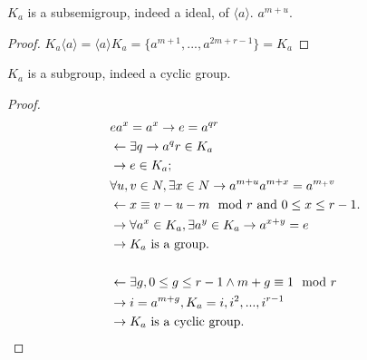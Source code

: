 \begin{Prop}
    $K_a$ is a subsemigroup, indeed a ideal, of $\langle a\rangle$. $a^{m+u}$.
    \begin{proof}
        $K_a\langle a\rangle=\langle a\rangle K_a=\{a^{m+1},...,a^{2m+r-1}\}=K_a$
    \end{proof}
    $K_a$ is a subgroup, indeed a cyclic group.
    \begin{proof}
        \begin{align*}
            &ea^x=a^x \rightarrow e=a^{qr}  \\
            &\leftarrow \exists q \rightarrow a^qr \in K_a \\
            &\rightarrow e \in K_a;  \\
            &\forall u,v \in N, \exists x \in N \rightarrow a^{m+u}a^{m+x}=a^{m_+v} \\
            &\leftarrow x\equiv v-u-m\mod{r} \text{\space and } 0\leq x\leq r-1. \\
            &\rightarrow \forall a^x \in K_a, \exists a^y \in K_a \rightarrow a^{x+y}=e \\
            &\rightarrow K_a \text{ is a group}.    \\
            &\\
            &\leftarrow \exists g,0\leq g\leq r-1 \wedge m+g\equiv 1\mod{r} \\
            &\rightarrow i=a^{m+g},K_a={i,i^2,...,i^{r-1}}  \\
            &\rightarrow K_a \text{ is a cyclic group}.
        \end{align*}
    \end{proof}
\end{Prop}

